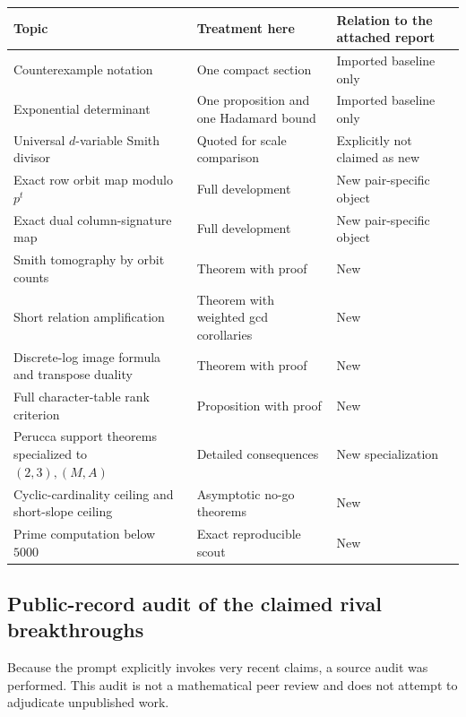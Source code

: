 \documentclass[11pt]{article}
\theoremstyle{definition}
\theoremstyle{remark}
\begin{document}
\begin{longtable}{>{\raggedright\arraybackslash}p{} >{\raggedright\arraybackslash}p{} >{\raggedright\arraybackslash}p{}}
\toprule
Topic & Treatment here & Relation to the attached report\\
\midrule
Counterexample notation & One compact section & Imported baseline only\\
Exponential determinant & One proposition and one Hadamard bound & Imported baseline only\\
Universal $d$-variable Smith divisor & Quoted for scale comparison & Explicitly not claimed as new\\
Exact row orbit map modulo $p^t$ & Full development & New pair-specific object\\
Exact dual column-signature map & Full development & New pair-specific object\\
Smith tomography by orbit counts & Theorem with proof & New\\
Short relation amplification & Theorem with weighted gcd corollaries & New\\
Discrete-log image formula and transpose duality & Theorem with proof & New\\
Full character-table rank criterion & Proposition with proof & New\\
Perucca support theorems specialized to $(2,3),(M,A)$ & Detailed consequences & New specialization\\
Cyclic-cardinality ceiling and short-slope ceiling & Asymptotic no-go theorems & New\\
Prime computation below $5000$ & Exact reproducible scout & New\\
\bottomrule
\end{longtable}

\subsection{Public-record audit of the claimed rival breakthroughs}

Because the prompt explicitly invokes very recent claims, a source audit was performed.  This audit is not a mathematical peer review and does not attempt to adjudicate unpublished work.
\end{document}
